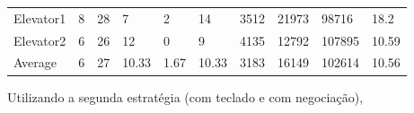 \documentclass[a4paper]{article}
\begin{document}
\begin{table}[h]
\begin{tabular}{@{}llllllllll@{}}
Elevator1 & 8        & 28            & 7           & 2                                                               & 14                                                                  & 3512                                                         & 21973                                                 & 98716                                                   & 18.2        \\
Elevator2 & 6        & 26            & 12           & 0                                                               & 9                                                                  & 4135                                                         & 12792                                                 & 107895                                                   & 10.59         \\
Average   & 6     & 27         & 10.33        & 1.67                                                               & 10.33                                                               & 3183                                                         & 16149                                                 & 102614                                                   & 10.56          \\ \bottomrule
\end{tabular}
\end{table}

Utilizando a segunda estratégia (com teclado e com negociação),
\end{document}
